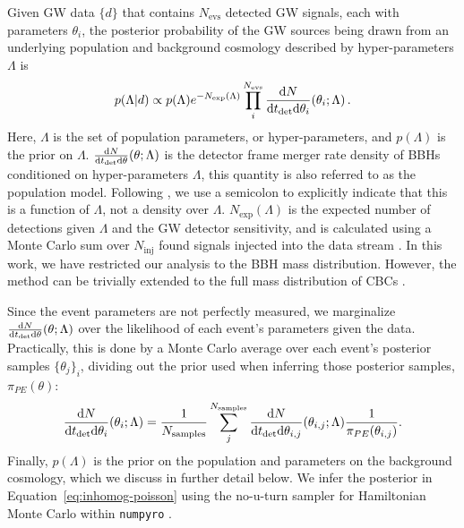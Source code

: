 \documentclass[]{aastex631}
\begin{document}
Given \ac{GW} data $\{d\}$ that contains $N_{\text{evs}}$ detected \ac{GW} signals, each with parameters $\theta_i$, the posterior probability of the \ac{GW} sources being drawn from an underlying population and background cosmology described by hyper-parameters $\Lambda$ is \citep{loredo_handling_2009, Taylor:2011fs, mandel_extracting_2019}
\begin{equation}
    p(\Lambda|d) \propto p(\Lambda) e^{-N_{\text{exp}}(\Lambda)} \prod_i^{N_{\text{evs}}} \frac{\diff N}{\diff t_{\det} \diff \theta_i} (\theta_i;\Lambda) \, .
    \label{eq:inhomog-poisson}
\end{equation}
Here, $\Lambda$ is the set of population parameters, or hyper-parameters, and $p(\Lambda)$ is the prior on $\Lambda$.
$\frac{\text{d} N}{\text{d} t_{\det} \text{d} \theta} (\theta;\Lambda)$ is the detector frame merger rate density of \acp{BBH} conditioned on hyper-parameters $\Lambda$, this quantity is also referred to as the population model. 
Following \citet{callister_parameter-free_2023}, we use a semicolon to explicitly indicate that this is a function of $\Lambda$, not a density over $\Lambda$.
$N_{\text{exp}}(\Lambda)$ is the expected number of detections given $\Lambda$ and the \ac{GW} detector sensitivity, and is calculated using a Monte Carlo sum over $N_{\text{inj}}$ found signals injected into the data stream \citep[see][for a detailed explanation of this process]{essick_estimating_2021, essick_precision_2022}.
In this work, we have restricted our analysis to the \ac{BBH} mass distribution.
However, the method can be trivially extended to the full mass distribution of \acp{CBC} \citep[e.g.][]{fishbach_does_2020, ezquiaga_spectral_2022}.

Since the event parameters are not perfectly measured, we marginalize $\frac{\text{d} N}{\text{d} t_{\det} \text{d} \theta} (\theta;\Lambda)$ over the likelihood of each event's parameters given the data.
Practically, this is done by a Monte Carlo average over each event's posterior samples $\{\theta_j\}_i$, dividing out the prior used when inferring those posterior samples, $\pi_{PE}(\theta)$:
\begin{equation}
    \frac{\diff N}{\diff t_{\det} \diff \theta_i} (\theta_i;\Lambda) = \frac{1}{N_{\text{samples}}}\sum_j^{N_{\text{samples}}} \frac{\diff N}{\diff t_{\det} \diff \theta_{i,j}} (\theta_{i,j};\Lambda) \frac{1}{\pi_{PE}(\theta_{i,j})} .
    \label{eq:single-event-likelihood}
\end{equation}
Finally, $p(\Lambda)$ is the prior on the population and parameters on the background cosmology, which we discuss in further detail below.
We infer the posterior in Equation~\ref{eq:inhomog-poisson} using the no-u-turn sampler for Hamiltonian Monte Carlo within \texttt{numpyro} \citep{hoffman_no-u-turn_2011, bingham_pyro_2019,phan_composable_2019}. 
\end{document}
